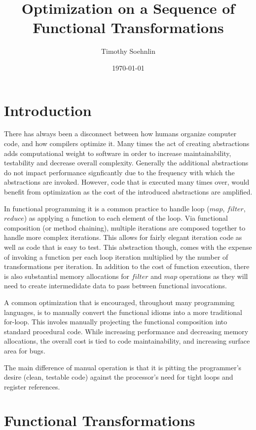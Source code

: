 \documentclass{article}
\title{Optimization on a Sequence of Functional Transformations}
\author{Timothy Soehnlin}
\date{\today}
\begin{document}
\maketitle

\section{Introduction}
There has always been a disconnect between how humans organize computer code, and how compilers optimize it.  Many times the act of creating abstractions adds computational weight to software in order to increase maintainability, testability and decrease overall complexity.  Generally the additional abstractions do not impact performance signficantly due to the frequency with which the abstractions are invoked.  However, code that is executed many times over, would benefit from optimization as the cost of the introduced abstractions are amplified.  

In functional programming it is a common practice to handle loop ($map$, $filter$, $reduce$) as applying a function to each element of the loop.  Via functional composition (or method chaining), multiple iterations are composed together to handle more complex iterations.  This allows for fairly elegant iteration code as well as code that is easy to test.  This abstraction though, comes with the expense of invoking a function per each loop iteration multiplied by the number of transformations per iteration. In addition to the cost of function execution, there is also substantial memory allocations for $filter$ and $map$ operations as they will need to create intermedidate data to pass between functional invocations.  

A common optimization that is encouraged, throughout many programming languages, is to manually convert the functional idioms into a more traditional for-loop.  This involes manually projecting the functional composition into standard procedural code.  While increasing performance and decreasing memory allocations, the overall cost is tied to code maintainability, and increasing surface area for bugs.  

The main difference of manual operation is that it is pitting the programmer's desire (clean, testable code) against the processor's need for tight loops and register references.  

\section{Functional Transformations}
\end{document}
